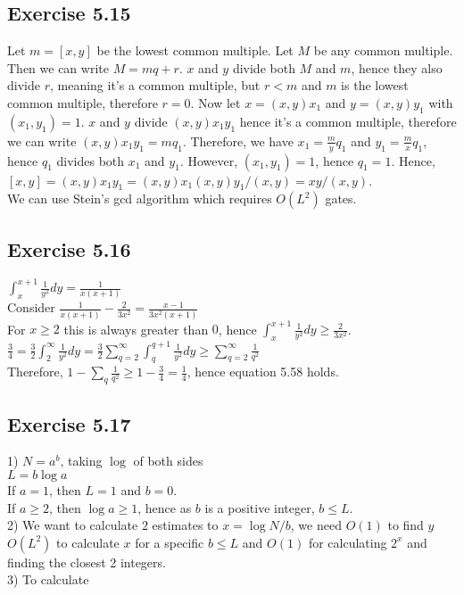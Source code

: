 \documentclass[a4paper,12pt]{article}
\begin{document}
\subsection*{Exercise 5.15}
Let $m=[x,y]$ be the lowest common multiple. Let $M$ be any common multiple. Then
we can write $M=mq+r$. $x$ and $y$ divide both $M$ and $m$, hence they also divide $r$, 
meaning it's a common multiple, but $r<m$ and $m$ is the lowest common multiple, therefore
$r=0$. Now let $x=(x,y)x_1$ and $y=(x,y)y_1$ with $(x_1,y_1)=1$. $x$ and $y$ divide
$(x,y)x_1y_1$ hence it's a common multiple, therefore we can write $(x,y)x_1y_1=mq_1$. Therefore, we have
$x_1=\frac{m}{y}q_1$ and $y_1=\frac{m}{x}q_1$, hence $q_1$ divides both $x_1$ and $y_1$.
However, $(x_1,y_1)=1$, hence $q_1=1$. Hence, $[x,y]=(x,y)x_1y_1=(x,y)x_1(x,y)y_1/(x,y)=
xy/(x,y)$.\\
We can use Stein's gcd algorithm which requires $O(L^2)$ gates.
\subsection*{Exercise 5.16}
$\displaystyle\int_x^{x+1}\frac{1}{y^2}dy=\frac{1}{x(x+1)}$\\
Consider $\displaystyle\frac{1}{x(x+1)}-\frac{2}{3x^2}=\frac{x-1}{3x^2(x+1)}$\\
For $x\geq 2$ this is always greater than $0$, hence 
$\displaystyle\int_x^{x+1}\frac{1}{y^2}dy\geq\frac{2}{3x^2}$.\\
$\displaystyle\frac{3}{4}=\frac{3}{2}\displaystyle\int_2^\infty\frac{1}{y^2}dy=\frac{3}{2}\sum_{q=2}^\infty\int_q^{q+1}\frac{1}{y^2}dy
\geq\sum_{q=2}^\infty \frac{1}{q^2}$\\
Therefore, $1-\displaystyle\sum_q\frac{1}{q^2}\geq 1-\frac{3}{4}=\frac{1}{4}$, hence
equation 5.58 holds.
\subsection*{Exercise 5.17}
1) $N=a^b$, taking $\log$ of both sides\\
$L=b\log{a}$\\
If $a=1$, then $L=1$ and $b=0$.\\
If $a\geq 2$, then $\log{a}\geq 1$, hence as $b$ is a positive integer, $b\leq L$.\\
2) We want to calculate $2$ estimates to $x=\log{N}/b$, we need $O(1)$ to find $y$ 
$O(L^2)$ to calculate $x$ for a specific $b\leq L$ and $O(1)$ for calculating $2^x$ and finding the
closest 2 integers.\\
3) To calculate
\end{document}

